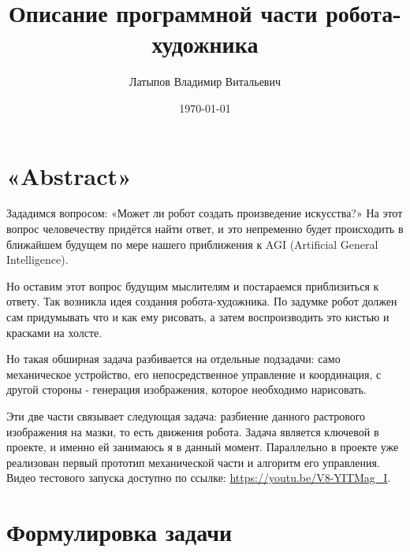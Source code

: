 \documentclass[11pt]{article}
\title{Описание программной части робота-художника}
\author{Латыпов Владимир Витальевич}
\date{\today}
\begin{document}
    \maketitle
    \newpage
    \tableofcontents
    \newpage

    \section{«Abstract»}\label{sec:abstract}
%

    Зададимся вопросом: «Может ли робот создать произведение искусства?»
    На этот вопрос человечеству придётся найти ответ,
    и это непременно будет происходить в ближайшем будущем
    по мере нашего приближения к AGI (Artificial General Intelligence).

    Но оставим этот вопрос будущим мыслителям и постараемся приблизиться к ответу.
    Так возникла идея создания робота-художника.
    По задумке робот должен сам придумывать что и как ему рисовать,
    а затем воспроизводить это кистью и красками на холсте.

    Но такая обширная задача разбивается на отдельные подзадачи:
    само механическое устройство, его непосредственное управление и координация,
    с другой стороны - генерация изображения, которое необходимо нарисовать.

    Эти две части связывает следующая задача: разбиение данного растрового изображения на мазки, то есть движения робота.
    Задача является ключевой в проекте, и именно ей занимаюсь я в данный момент.
    Параллельно в проекте уже реализован первый прототип механической части и алгоритм его управления. Видео тестового запуска доступно по ссылке:
    \url{https://youtu.be/V8-YITMag_I}.

    \section{Формулировка задачи}\label{sec:formulating_task}
\end{document}
